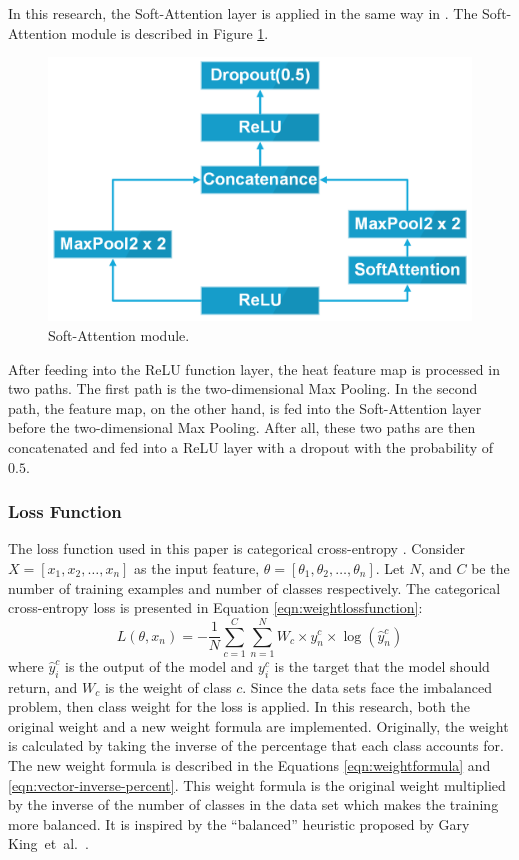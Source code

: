 \documentclass[sensors,article,accept,pdftex,moreauthors]{Definitions/mdpi}
\begin{document}
	In this research, the Soft-Attention layer is applied in the same way in \cite{03358}. The Soft-Attention module is described in Figure \ref{fig:soft-attention-block}. 
	
	\begin{figure}[H]
		\includegraphics[width=0.5\linewidth]{Definitions/SoftAttentionBlock}
		\caption{{Soft-Attention module.} %
}
		\label{fig:soft-attention-block}
	\end{figure}
	
	After feeding into the ReLU function layer, the heat feature map is processed in two paths. The first path is the two-dimensional Max Pooling. In the second path, the feature map, on the other hand, is fed into the Soft-Attention layer before the two-dimensional Max Pooling. After all, these two paths are then concatenated and fed into a ReLU layer with a dropout with the probability of $0.5$.
	
	\subsubsection{Loss Function}
	The loss function used in this paper is categorical cross-entropy {\mbox{\cite{8943952}}}. %
	Consider $X = [x_1, x_2, \dots, x_n]$ as the input feature, $\theta = [\theta_1, \theta_2, \dots, \theta_n]$. Let $N$, and $C$ be the number of training examples and number of classes respectively. The categorical cross-entropy loss is presented in Equation \eqref{eqn:weightlossfunction}:
	\begin{equation}
		\label{eqn:weightlossfunction}
		L(\theta, x_n) = -\frac{1}{N}\sum_{c=1}^{C}\sum_{n=1}^{N}W_c\times y^c_n \times \log(\hat{y}^c_n)
	\end{equation}
	where $\hat{y}^c_i$  is the output of the model and $y^c_i$ is the target that the model should return, and $W_c$ is the weight of class $c$. Since the data sets face the imbalanced problem, then class weight for the loss is applied. In this research, both the original weight and a new weight formula are implemented. Originally, the weight is calculated by taking the inverse of the percentage that each class accounts for. The new weight formula is described in the Equations \eqref{eqn:weightformula} and \eqref{eqn:vector-inverse-percent}. {This weight formula is the original weight multiplied by the inverse of the number of classes in the data set which makes the training more balanced. It is inspired by the “balanced” heuristic proposed by Gary King~et~al.~\mbox{\cite{WV006-01}}}.
	
\end{document}
